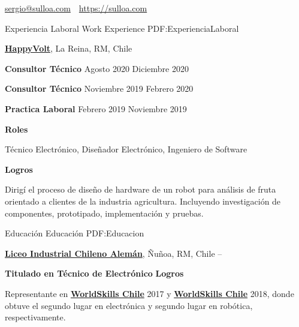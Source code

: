 \documentclass[letterpaper,yyyy,draft]{simpleresumecv}
\newcommand{\CVAuthor}{Sergio A. Ulloa B.}
\newcommand{\CVWebpage}{https://sulloa.com}
\begin{document}
\makeatletter
\let\@oddfoot\@empty
\let\@evenfoot\@empty
\makeatother

\Title{\CVAuthor}

{
    \begin{SubTitle}
    \href{mailto:sergio@sulloa.com}{sergio@sulloa.com}
    \,\SubBulletSymbol\,
    \href{\CVWebpage}{\url{\CVWebpage}}
    \end{SubTitle}
}

\begin{Body}


\Section
{Experiencia\newline
Laboral}
{Work Experience}
{PDF:ExperienciaLaboral}
{
    \Entry
    \href{https://happyvolt.com/}{\textbf{HappyVolt}},
    La Reina, RM, Chile

    \BulletItem
    \textbf{Consultor Técnico}
    \hfill
    Agosto 2020
    Diciembre 2020

    \Gap
    \BulletItem
    \textbf{Consultor Técnico}
    \hfill
    Noviembre 2019
    Febrero 2020

    \Gap
    \BulletItem
    \textbf{Practica Laboral}
    \hfill
    Febrero 2019
    Noviembre 2019

    \Gap
    \BulletItem
    \textbf{Roles}
    \hfill
    \begin{Detail}
    \SubBulletItem
    Técnico Electrónico, Diseñador Electrónico, Ingeniero de Software
    \end{Detail}

    \Gap
    \BulletItem
    \textbf{Logros}
    \hfill
    \begin{Detail}
    \SubBulletItem
    Dirigí el proceso de diseño de hardware de un robot para análisis de fruta orientado a clientes de la industria agricultura. Incluyendo investigación de componentes, prototipado, implementación y pruebas.
    \end{Detail}
}


\Section
{Educación}
{Educación}
{PDF:Educacion}
{
    \Entry
    \href{https://www.lichan.cl/}{\textbf{Liceo Industrial Chileno Alemán}},
    Ñuñoa, RM, Chile
    \hfill
     -- 

    \Gap
    \BulletItem
    \textbf{Titulado en Técnico de Electrónico}
    \Gap
    \BulletItem
    \textbf{Logros}
    \begin{Detail}
    \SubBulletItem
    Representante en \href{https://worldskills.org/}{\textbf{WorldSkills Chile}} 2017 y \href{https://worldskills.org/}{\textbf{WorldSkills Chile}} 2018, donde obtuve el segundo lugar en electrónica y segundo lugar en robótica, respectivamente.
    \end{Detail}
}


\end{Body}
\end{document}
